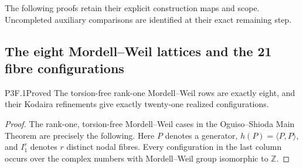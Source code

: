 \providecommand{\tightlist}{\setlength{\itemsep}{0pt}\setlength{\parskip}{0pt}}
\noindent The following proofs retain their explicit construction maps and scope. Uncompleted auxiliary comparisons are identified at their exact remaining step.
\subsection{The eight Mordell--Weil lattices and the 21 fibre configurations}
\begin{statement}{P3F.1}{Proved}
The torsion-free rank-one Mordell--Weil rows are exactly eight, and their Kodaira refinements give exactly twenty-one realized configurations.
\end{statement}
\begin{proof}
The rank-one, torsion-free Mordell--Weil cases in the Oguiso--Shioda Main Theorem are precisely the following. Here \(P\) denotes a generator, \(h(P)=\langle P,P\rangle\), and \(I_1^r\) denotes \(r\) distinct nodal fibres. Every configuration in the last column occurs over the complex numbers with Mordell--Weil group isomorphic to \(\mathbb Z\).


\end{proof}
